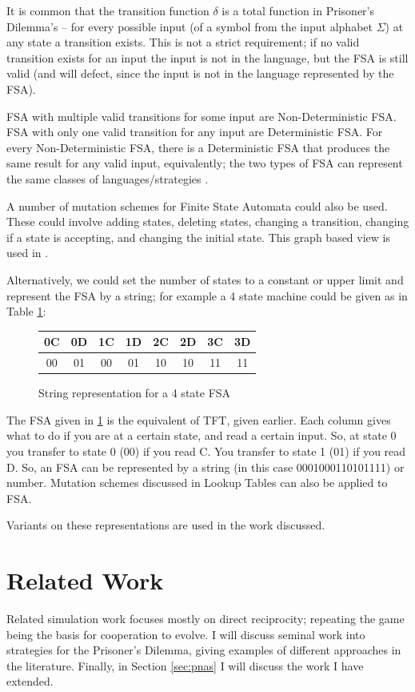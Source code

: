 \documentclass[a4paper,11pt,bcshonoursthesis,singlespace,oneside,thesisdraft,pdflatex]{cssethesis}
\renewcommand{\cite}{\citep} %
\begin{document}
It is common that the transition function $\delta$ is a total function in Prisoner's Dilemma's -- for every possible input (of a symbol from the input alphabet $\Sigma$) at any state a transition exists. 
This is not a strict requirement; if no valid transition exists for an input the input is not in the language, but the FSA is still valid (and will defect, since the input is not in the language represented by the FSA). 

FSA with multiple valid transitions for some input are Non-Deterministic FSA. 
FSA with only one valid transition for any input are Deterministic FSA. 
For every Non-Deterministic FSA, there is a Deterministic FSA that produces the same result for any valid input, equivalently; the two types of FSA can represent the same classes of languages/strategies \citep[][pp 35 -- 63]{Sipser2006}. 

A number of mutation schemes for Finite State Automata could also be used. 
These could involve adding states, deleting states, changing a transition, changing if a state is accepting, and changing the initial state. 
This graph based view is used in \cite{van-veelen:PNAS:2012}. 

Alternatively, we could set the number of states to a constant or upper limit and represent the FSA by a string; for example a 4 state machine could be given as in Table \ref{table:fsa4state}:
\begin{figure}[h]
\center
\begin{tabular}{|c|c|c|c|c|c|c|c|}
\hline
0C & 0D & 1C&1D&2C&2D&3C&3D\\
\hline
00 & 01 & 00&01&10&10&11&11\\
\hline
\end{tabular}\hfill
\caption{String representation for a 4 state FSA}
\label{table:fsa4state}
\end{figure}
The FSA given in \ref{table:fsa4state} is the equivalent of TFT, given earlier. 
Each column gives what to do if you are at a certain state, and read a certain input. 
So, at state 0 you transfer to state 0 (00) if you read C. 
You transfer to state 1 (01) if you read D. 
So, an FSA can be represented by a string (in this case 0001000110101111) or number. 
Mutation schemes discussed in Lookup Tables can also be applied to FSA. 

Variants on these representations are used in the work discussed.
\section{Related Work}
\label{sec:relatedWork}
Related simulation work focuses mostly on direct reciprocity; repeating the game being the basis for cooperation to evolve. 
I will discuss seminal work into strategies for the Prisoner's Dilemma, giving examples of different approaches in the literature. Finally, in Section \ref{sec:pnas} I will discuss the work I have extended.
\end{document}
